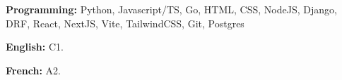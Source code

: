 

\begin{cvpubs}

  \cvpub
    {
      \begin{cvlist}
        \item{\textbf{Programming:} Python, Javascript/TS, Go, HTML, CSS, NodeJS, Django, DRF, React, NextJS, Vite, TailwindCSS, Git, Postgres }
        \item{\textbf{English:} C1. }
        \item{\textbf{French:} A2. }
      \end{cvlist}
    }\vspace{-4pt}
\end{cvpubs}